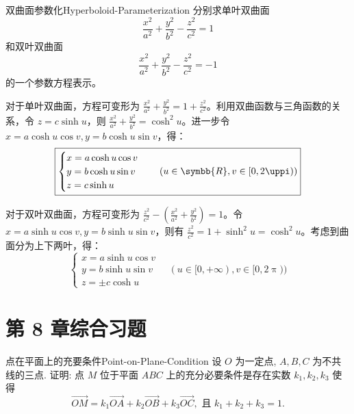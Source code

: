 \begin{problem}{双曲面参数化}{Hyperboloid-Parameterization}
    分别求单叶双曲面
    \begin{equation*}
        \frac{x^2}{a^2} + \frac{y^2}{b^2} - \frac{z^2}{c^2} = 1
    \end{equation*}
    和双叶双曲面
    \begin{equation*}
        \frac{x^2}{a^2} + \frac{y^2}{b^2} - \frac{z^2}{c^2} = -1
    \end{equation*}
    的一个参数方程表示。
\end{problem}

\begin{solution}

    对于单叶双曲面，方程可变形为 $\frac{x^2}{a^2} + \frac{y^2}{b^2} = 1 + \frac{z^2}{c^2}$。利用双曲函数与三角函数的关系，令 $z = c \sinh u$，则 $\frac{x^2}{a^2} + \frac{y^2}{b^2} = \cosh^2 u$。进一步令 $x = a \cosh u \cos v, y = b \cosh u \sin v$，得：
    \begin{equation*}
        \boxed{\begin{cases} x = a \cosh u \cos v \\ y = b \cosh u \sin v \\ z = c \sinh u \end{cases} \quad (u \in \symbb{R}, v \in [0, 2\uppi))}
    \end{equation*}


    对于双叶双曲面，方程可变形为 $\frac{z^2}{c^2} - \left( \frac{x^2}{a^2} + \frac{y^2}{b^2} \right) = 1$。令 $x = a \sinh u \cos v, y = b \sinh u \sin v$，则有 $\frac{z^2}{c^2} = 1 + \sinh^2 u = \cosh^2 u$。考虑到曲面分为上下两叶，得：
    \begin{equation*}
        \boxed{\begin{cases} x = a \sinh u \cos v \\ y = b \sinh u \sin v \\ z = \pm c \cosh u \end{cases} \quad (u \in [0, +\infty), v \in [0, 2\uppi))}
    \end{equation*}
\end{solution}


\section{第 8 章综合习题}

\begin{problem}{点在平面上的充要条件}{Point-on-Plane-Condition}
    设 $O$ 为一定点, $A, B, C$ 为不共线的三点. 证明: 点 $M$ 位于平面 $ABC$ 上的充分必要条件是存在实数 $k_1, k_2, k_3$ 使得
    \begin{equation*}
        \overrightarrow{OM} = k_1\overrightarrow{OA} + k_2\overrightarrow{OB} + k_3\overrightarrow{OC}, \text{ 且 } k_1 + k_2 + k_3 = 1.
    \end{equation*}
\end{problem}

